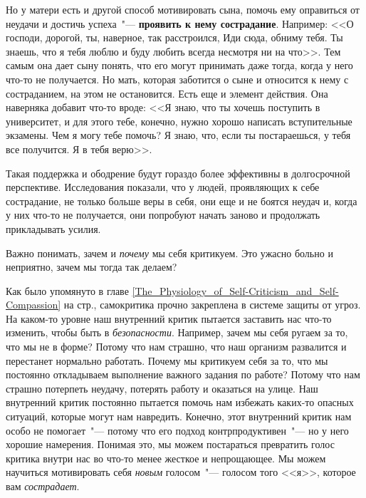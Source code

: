 Но у матери есть и другой способ мотивировать сына, помочь ему оправиться от неудачи и достичь успеха~"--- \textbf{проявить к нему сострадание}. Например: <<О господи, дорогой, ты, наверное, так расстроился, Иди сюда, обниму тебя. Ты знаешь, что я тебя люблю и буду любить всегда несмотря ни на что>>. Тем самым она дает сыну понять, что его могут принимать даже тогда, когда у него что-то не получается. Но мать, которая заботится о сыне и относится к нему с состраданием, на этом не остановится. Есть еще и элемент действия. Она наверняка добавит что-то вроде: <<Я знаю, что ты хочешь поступить в университет, и для этого тебе, конечно, нужно хорошо написать вступительные экзамены. Чем я могу тебе помочь? Я знаю, что, если ты постараешься, у тебя все получится. Я в тебя верю>>.
		
Такая поддержка и ободрение будут гораздо более эффективны в долгосрочной перспективе. Исследования показали, что у людей, проявляющих к себе сострадание, не только больше веры в себя, они еще и не боятся неудач и, когда у них что-то не получается, они попробуют начать заново и продолжать прикладывать усилия.

Важно понимать, зачем и \emph{почему} мы себя критикуем. Это ужасно больно и неприятно, зачем мы тогда так делаем? 

Как было упомянуто в главе \ref{The_Physiology_of_Self-Criticism_and_Self-Compassion} на стр.\:\pageref{The_Physiology_of_Self-Criticism_and_Self-Compassion}, самокритика прочно закреплена в системе защиты от угроз. На каком-то уровне наш внутренний критик пытается заставить нас что-то изменить, чтобы быть в \emph{безопасности}. Например, зачем мы себя ругаем за то, что мы не в форме? Потому что нам страшно, что наш организм развалится и перестанет нормально работать. Почему мы критикуем себя за то, что мы постоянно откладываем выполнение важного задания по работе? Потому что нам страшно потерпеть неудачу, потерять работу и оказаться на улице. Наш внутренний критик постоянно пытается помочь нам избежать каких-то опасных ситуаций, которые могут нам навредить. Конечно, этот внутренний критик нам особо не помогает~"--- потому что его подход контрпродуктивен~"--- но у него хорошие намерения. Понимая это, мы можем постараться превратить голос критика внутри нас во что-то менее жесткое и непрощающее. Мы можем научиться мотивировать себя \emph{новым} голосом~"--- голосом того <<я>>, которое вам \emph{сострадает}. 


